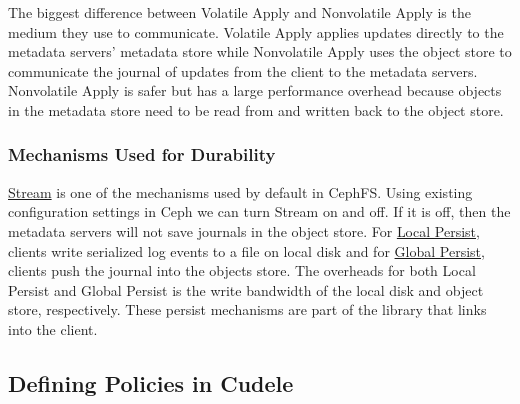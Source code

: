 The biggest difference between Volatile Apply and Nonvolatile Apply is
the medium they use to communicate. Volatile Apply applies updates directly
to the metadata servers' metadata store while Nonvolatile Apply uses the
object store to communicate the journal of updates from the client to the
metadata servers.  Nonvolatile Apply is safer but has a large performance
overhead because objects in the metadata store need to be read from and written
back to the object store.


\subsubsection{Mechanisms Used for Durability} \underline{Stream} is one of the
mechanisms used by default in CephFS.  Using existing configuration settings in
Ceph we can turn Stream on and off.  If it is off, then the metadata servers
will not save journals in the object store. For \underline{Local Persist}, clients write
serialized log events to a file on local disk and for \underline{Global Persist},
clients push the journal into the objects store. The overheads for both Local
Persist and Global Persist is the write bandwidth of the local disk and
object store, respectively.  These persist mechanisms are part of the library that
links into the client.

\subsection{Defining Policies in Cudele}
\label{sec:setting-policies-with-cudele}

